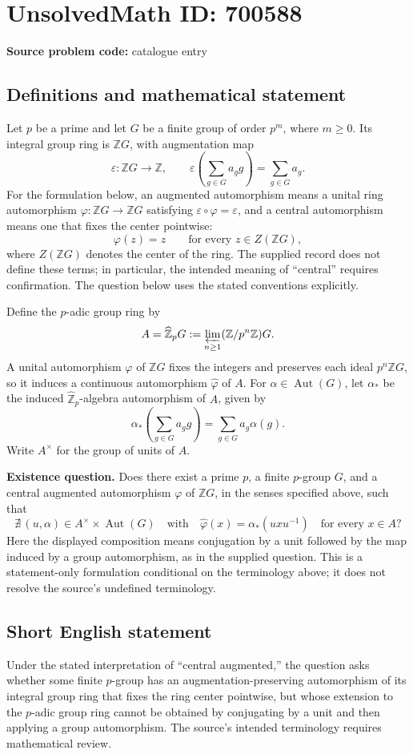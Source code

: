 \documentclass[11pt]{article}
\newcommand{\Z}{\mathbb{Z}}
\begin{document}
\section*{UnsolvedMath ID: 700588}
\textbf{Source problem code:} catalogue entry
\subsection{Definitions and mathematical statement}
Let \(p\) be a prime and let \(G\) be a finite group of order \(p^m\), where \(m\geq 0\). Its integral group ring is \(\Z G\), with augmentation map
\[
\varepsilon:\Z G\longrightarrow\Z,\qquad \varepsilon\!\left(\sum_{g\in G}a_g g\right)=\sum_{g\in G}a_g.
\]
For the formulation below, an augmented automorphism means a unital ring automorphism \(\varphi:\Z G\to\Z G\) satisfying \(\varepsilon\circ\varphi=\varepsilon\), and a central automorphism means one that fixes the center pointwise:
\[
\varphi(z)=z\qquad\text{for every }z\in Z(\Z G),
\]
where \(Z(\Z G)\) denotes the center of the ring. The supplied record does not define these terms; in particular, the intended meaning of ``central'' requires confirmation. The question below uses the stated conventions explicitly.

Define the \(p\)-adic group ring by
\[
A=\widehat{\Z}_p G:=\varprojlim_{n\geq 1}(\Z/p^n\Z)G.
\]
A unital automorphism \(\varphi\) of \(\Z G\) fixes the integers and preserves each ideal \(p^n\Z G\), so it induces a continuous automorphism \(\widehat\varphi\) of \(A\). For \(\alpha\in\operatorname{Aut}(G)\), let \(\alpha_*\) be the induced \(\widehat{\Z}_p\)-algebra automorphism of \(A\), given by
\[
\alpha_*\!\left(\sum_{g\in G}a_g g\right)=\sum_{g\in G}a_g\alpha(g).
\]
Write \(A^\times\) for the group of units of \(A\).

\textbf{Existence question.} Does there exist a prime \(p\), a finite \(p\)-group \(G\), and a central augmented automorphism \(\varphi\) of \(\Z G\), in the senses specified above, such that
\[
\nexists\,(u,\alpha)\in A^\times\times\operatorname{Aut}(G)
\quad\text{with}\quad
\widehat\varphi(x)=\alpha_*(u x u^{-1})\quad\text{for every }x\in A?
\]
Here the displayed composition means conjugation by a unit followed by the map induced by a group automorphism, as in the supplied question. This is a statement-only formulation conditional on the terminology above; it does not resolve the source's undefined terminology.
\subsection{Short English statement}
Under the stated interpretation of ``central augmented,'' the question asks whether some finite \(p\)-group has an augmentation-preserving automorphism of its integral group ring that fixes the ring center pointwise, but whose extension to the \(p\)-adic group ring cannot be obtained by conjugating by a unit and then applying a group automorphism. The source's intended terminology requires mathematical review.
\end{document}
